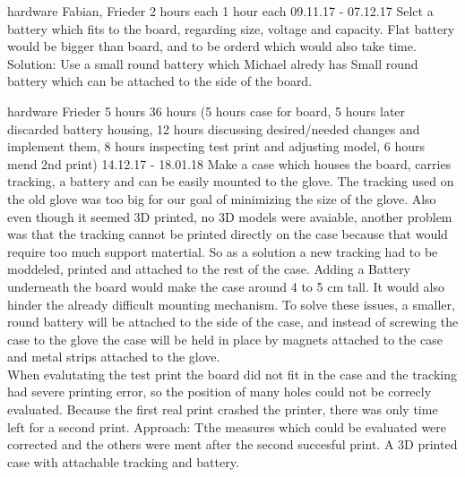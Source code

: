 	{hardware}%
	{Fabian, Frieder}%
	{2 hours each}%
	{1 hour each}%
	{09.11.17 - 07.12.17}%
	{Selct a battery which fits to the board, regarding size, voltage and capacity.}%
	{Flat battery would be bigger than board, and to be orderd which would also take time. Solution: Use a small round battery which Michael alredy has}%
	{Small round battery which can be attached to the side of the board.}%
	
	{hardware}%
	{Frieder}%
	{5 hours}%
	{36 hours (5 hours case for board, 5 hours later discarded battery housing, 12 hours discussing desired/needed changes and implement them, 8 hours inspecting test print and adjusting model, 6 hours mend 2nd print)}%
	{14.12.17 - 18.01.18}%
	{Make a case which houses the board, carries tracking, a battery and can be easily mounted to the glove.}%
	{The tracking used on the old glove was too big for our goal of minimizing the size of the glove. Also even though it seemed 3D printed, no 3D models were avaiable, another problem was that the tracking cannot be printed directly on the case because that would require too much support matertial. So as a solution a new tracking had to be moddeled, printed and attached to the rest of the case. Adding a Battery underneath the board would make the case around 4 to 5 cm tall. It would also hinder the already difficult mounting mechanism. To solve these issues, a smaller, round battery will be attached to the side of the case, and instead of screwing the case to the glove the case will be held in place by magnets attached to the case and metal strips attached to the glove. \\
	When evalutating the test print the board did not fit in the case and the tracking had severe printing error, so the position of many holes could not be correcly evaluated. Because the first real print crashed the printer, there was only time left for a second print. Approach: Tthe measures which could be evaluated were corrected and the others were  ment after the second succesful print.}%
	{A 3D printed case with attachable tracking and battery.}%
	
